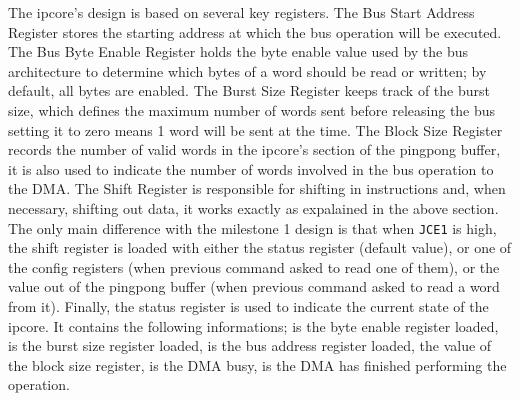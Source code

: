 \documentclass[a4paper,11pt,oneside]{report}
\begin{document}
The ipcore's design is based on several key registers. The Bus Start Address Register stores the starting address at which the bus operation will be executed. 
The Bus Byte Enable Register holds the byte enable value used by the bus architecture to determine which bytes of a word should be read or written; 
by default, all bytes are enabled. The Burst Size Register keeps track of the burst size, which defines the maximum number of words sent before releasing the bus setting it to zero means 
1 word will be sent at the time. 
The Block Size Register records the number of valid words in the ipcore's section of the pingpong buffer, it is also used to indicate the number of words involved in the 
bus operation to the DMA. 
The Shift Register is responsible for shifting in instructions and, when necessary, shifting out data, it works exactly as expalained in the above section. The only 
main difference with the milestone 1 design is that when \texttt{JCE1} is high, the shift register is loaded with either the status register (default value), or one of the config registers
(when previous command asked to read one of them), or the value out of the pingpong buffer (when previous command asked to read a word from it).
Finally, the status register is used to indicate the current state of the ipcore. It contains the following informations; is the byte enable register loaded, 
is the burst size register loaded, is the bus address register loaded, the value of the block size register, is the DMA busy, is the DMA has finished performing the operation.
\end{document}
